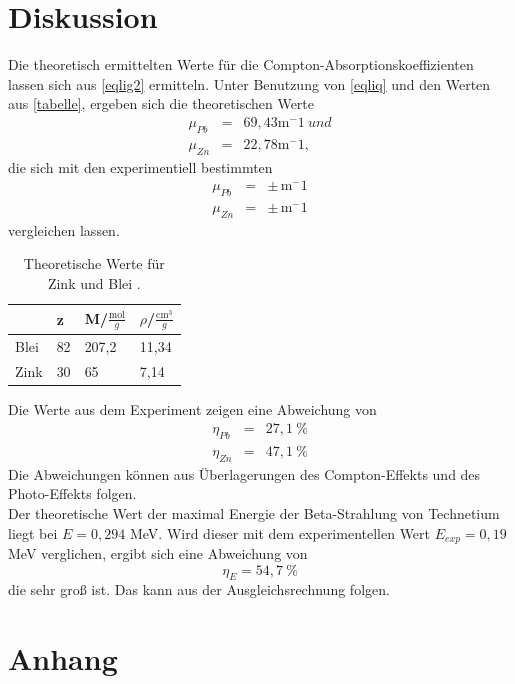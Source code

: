 \section{Diskussion}
\label{sec:Diskussion}


Die theoretisch ermittelten Werte für die Compton-Absorptionskoeffizienten lassen sich aus \eqref{eqlig2} ermitteln. Unter Benutzung von \eqref{eqliq} und den Werten aus \autoref{tabelle}, ergeben sich die theoretischen Werte
\begin{eqnarray}
  \mu_{Pb} &=& 69,43  \mathrm{m^-1}\ und \nonumber \\
  \mu_{Zn} &=& 22,78  \mathrm{m^-1}, \nonumber 
\end{eqnarray}
die sich mit den experimentiell bestimmten 
\begin{eqnarray}
  \mu_{Pb} &=&   \pm  \,  \mathrm{m^-1} \nonumber \\
  \mu_{Zn} &=&   \pm  \,  \mathrm{m^-1} \nonumber 
\end{eqnarray}
vergleichen lassen.
\begin{table}[H]
 \centering
 \caption{Theoretische Werte für Zink und Blei \cite{2} \cite{3}.}
 \begin{tabular}{l|l|l|l}
 & z & M/$\frac{\textrm{mol}}{g}$ & $\rho$/$\frac{\textrm{cm}^3}{g}$\\\hline
 Blei & 82 & 207,2 & 11,34\\
 Zink & 30 & 65 & 7,14\\\hline
 \end{tabular}
\end{table}
Die Werte aus dem Experiment zeigen eine Abweichung von
\begin{eqnarray}
  \eta_{Pb} &=& 27,1 \ \% \nonumber \\
  \eta_{Zn} &=& 47,1 \ \% \nonumber 
\end{eqnarray}
Die Abweichungen können aus Überlagerungen des Compton-Effekts und des Photo-Effekts folgen.\\
Der theoretische Wert der maximal Energie der Beta-Strahlung von Technetium liegt bei $E=0,294$ MeV. Wird dieser mit dem experimentellen Wert $E_{exp}=0,19$ MeV verglichen, ergibt sich eine Abweichung von 
\begin{equation*}
  \eta_{E}=54,7 \ \%
\end{equation*}
die sehr groß ist. Das kann aus der Ausgleichsrechnung folgen. 

\section{Anhang}
\label{sec:anhang}

